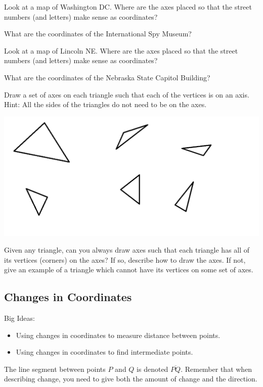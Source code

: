 \bq\label{cq} \be
\item  Look at a map of Washington DC. Where are the axes placed so that the street numbers (and letters) make sense as coordinates?
\item What are the coordinates of the International Spy Museum?
\ee \eq

\bq \be
\item  Look at a map of Lincoln NE. Where are the axes placed so that the street numbers (and letters) make sense as coordinates?
\item What are the coordinates of the Nebraska State Capitol Building?
\ee \eq

\bq Draw a set of axes on each triangle such that each of the vertices is on an axis. Hint: All the sides of the triangles do not need to be on the axes.

\includegraphics[scale=.5]{trianglearray.png}
\eq

\bq\label{q2} Given any triangle, can you always draw axes such that each triangle has all of its vertices (corners) on the axes? If so, describe how to draw the axes. If not, give an example of a triangle which cannot have its vertices on some set of axes.
\eq
\subsection{Changes in Coordinates}
Big Ideas:
\begin{itemize}
\item Using changes in coordinates to measure distance between points.
\item Using changes in coordinates to find intermediate points.
\end{itemize}
\begin{info} The line segment between points $P$ and $Q$ is denoted $\overline{PQ}$. Remember that when describing change, you need to give both the amount of change and the direction. \end{info}

